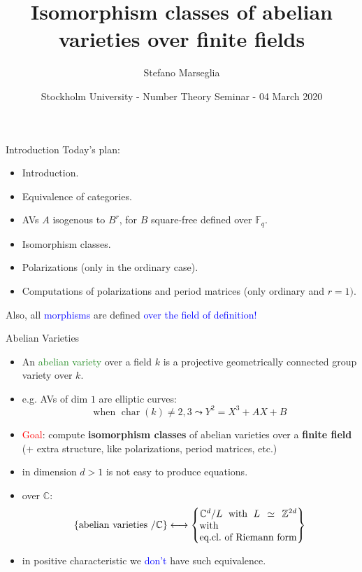 \documentclass[usenames,dvipsnames]{beamer}
\title[]{Isomorphism classes of abelian varieties over finite fields}
\subtitle{}
\author[Marseglia Stefano]{Stefano Marseglia}
\institute[]{Utrecht University}
\date[04 March 2020]{Stockholm University - Number Theory Seminar - 04 March 2020}
\def\Z{\mathbb{Z}}
\def\C{\mathbb{C}}
\def\F{\mathbb{F}}
\DeclareMathOperator{\Char}{char}
\newcommand{\set}[1]{\left\lbrace#1\right\rbrace }
\newcommand{\red}[1]{\textcolor{red}{#1}}
\newcommand{\blue}[1]{\textcolor{blue}{#1}}
\newcommand{\green}[1]{\textcolor{ForestGreen}{#1}}
\begin{document}
\begin{frame}
\titlepage
\end{frame}

\begin{frame}{ Introduction }
Today's plan:
\begin{itemize}
 \item Introduction.
 \item Equivalence of categories.
 \item AVs $A$ isogenous to $B^r$, for $B$ square-free defined over $\F_q$.
 \item Isomorphism classes.
 \item Polarizations (only in the ordinary case).
 \item Computations of polarizations and period matrices (only ordinary and $r=1)$.
\end{itemize}
Also, all \blue{morphisms} are defined \blue{over the field of definition!}
\end{frame}

\begin{frame}{ Abelian Varieties }
\begin{itemize}
 \item An \green{abelian variety} over a field $k$ is a projective geometrically connected group variety over $k$.
 \pause \item e.g. AVs of dim $1$ are elliptic curves:
 \[\text{when }\Char(k)\neq 2,3 \leadsto Y^2=X^3+AX+B  \]
 \vspace{-2em}\pause \item \red{Goal}: compute \textbf{isomorphism classes} of abelian varieties over a \textbf{finite field} (+ extra structure, like polarizations, period matrices, etc.)
 \pause \item in dimension $d>1$ is not easy to produce equations.
 \pause \item over $\C$:
 \[
      \set{ \text{abelian varieties $/\C$} } \longleftrightarrow 
      \set{\parbox[c]{10em}{$\C^d/L$ with $L\simeq \Z^{2d}$ with\\eq.cl.~of Riemann form}}
 \]
 \pause \vspace{-6mm} \item in positive characteristic we \blue{don't} have such equivalence.
\end{itemize}
\end{frame}
\end{document}
